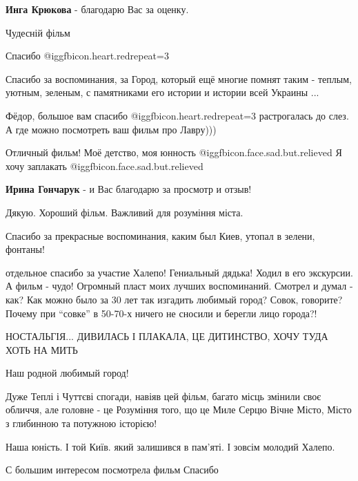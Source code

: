 \begin{itemize}
\textbf{Инга Крюкова} - благодарю Вас за оценку.

Чудесній фільм

Спасибо @igg{fbicon.heart.red}{repeat=3} 🐅


Спасибо за воспоминания, за Город, который ещё многие помнят таким - теплым,
уютным, зеленым, с памятниками его истории и истории всей Украины ...


Фёдор, большое вам спасибо @igg{fbicon.heart.red}{repeat=3} растрогалась до
слез. А где можно посмотреть ваш фильм про Лавру)))


Отличный фильм! Моё детство, моя юнность @igg{fbicon.face.sad.but.relieved}  Я
хочу заплакать @igg{fbicon.face.sad.but.relieved} 

\textbf{Ирина Гончарук} - и Вас благодарю за просмотр и отзыв!


Дякую. Хороший фільм. Важливий для розуміння міста.

Спасибо за прекрасные воспоминания, каким был Киев, утопал в зелени, фонтаны!


отдельное спасибо за участие Халепо! Гениальный дядька! Ходил в его экскурсии.
А фильм - чудо! Огромный пласт моих лучших воспоминаний. Смотрел и думал - как?
Как можно было за 30 лет так изгадить любимый город? Совок, говорите? Почему
при \enquote{совке} в 50-70-х ничего не сносили и берегли лицо города?!

НОСТАЛЬГІЯ... ДИВИЛАСЬ І ПЛАКАЛА, ЦЕ ДИТИНСТВО, ХОЧУ ТУДА ХОТЬ НА МИТЬ

Наш родной любимый город!


Дуже Теплі і Чуттєві спогади, навіяв цей фільм, багато місць змінили своє
обличчя, але головне - це Розуміння того, що це Миле Серцю Вічне Місто, Місто з
глибинною та потужною історією!

Наша юність. І той Київ. який залишився в пам'яті. І зовсім молодий Халепо.


С большим интересом посмотрела фильм
Спасибо

\end{itemize} %
